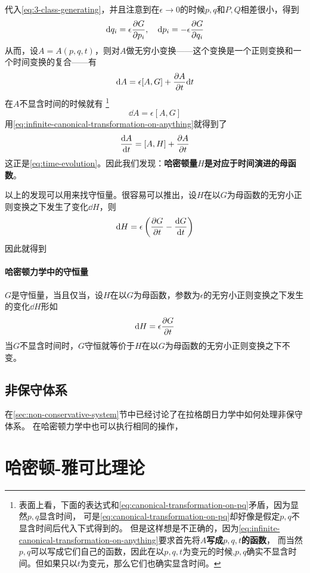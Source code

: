 \documentclass[UTF8, a4paper]{ctexart}
\begin{document}
代入\eqref{eq:3-class-generating}，并且注意到在$\epsilon \to 0$的时候$p, q$和$P, Q$相差很小，得到
\begin{equation}
    \dd q_i = \epsilon \pdv{G}{p_i}, \quad
    \dd p_i = - \epsilon \pdv{G}{q_i}
    \label{eq:canonical-transformation-on-pq}
\end{equation}
从而，设$A=A(p, q, t)$，则对$A$做无穷小变换——这个变换是一个正则变换和一个时间变换的复合——有
\begin{equation}
    \dd A = \epsilon [A, G] + \pdv{A}{t} \dd t
    \label{eq:infinite-canonical-transformation-on-anything}
\end{equation}
在$A$不显含时间的时候就有%
\footnote{表面上看，下面的表达式和\eqref{eq:canonical-transformation-on-pq}矛盾，因为显然$p, q$显含时间，
可是\eqref{eq:canonical-transformation-on-pq}却好像是假定$p, q$不显含时间后代入下式得到的。
但是这样想是不正确的，因为\eqref{eq:infinite-canonical-transformation-on-anything}要求首先将$A$\textbf{写成$p, q, t$的函数}，
而当然$p, q$可以写成它们自己的函数，因此在以$p, q, t$为变元的时候,$p, q$确实不显含时间。但如果只以$t$为变元，那么它们也确实显含时间。
}%
\[
    \dd A = \epsilon [A, G]
\]
用\eqref{eq:infinite-canonical-transformation-on-anything}就得到了
\[
    \dv{A}{t} = [A, H] + \pdv{A}{t}
\]
这正是\eqref{eq:time-evolution}。因此我们发现：\textbf{哈密顿量$H$是对应于时间演进的母函数}。

以上的发现可以用来找守恒量。很容易可以推出，设$H$在以$G$为母函数的无穷小正则变换之下发生了变化$\dd H$，则
\[
    \dd H = \epsilon \left( \pdv{G}{t} - \dv{G}{t} \right)
\]
因此就得到

\paragraph{哈密顿力学中的守恒量} $G$是守恒量，当且仅当，设$H$在以$G$为母函数，参数为$\epsilon$的无穷小正则变换之下发生的变化$\dd H$形如
\begin{equation}
    \dd H = \epsilon \pdv{G}{t}
\end{equation}
当$G$不显含时间时，$G$守恒就等价于$H$在以$G$为母函数的无穷小正则变换之下不变。

\subsection{非保守体系}
在\ref{sec:non-conservative-system}节中已经讨论了在拉格朗日力学中如何处理非保守体系。
在哈密顿力学中也可以执行相同的操作，

\section{哈密顿-雅可比理论}
\end{document}
